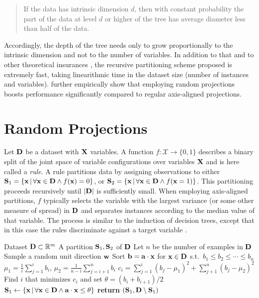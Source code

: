 \begin{quote}
  If the data has intrinsic dimension $d$, then with constant probability the part of the data at
  level $d$ or higher of the tree has average diameter less than half of the data.
\end{quote}

Accordingly, the depth of the tree needs only to grow proportionally to the intrinsic dimension and
not to the number of variables. In addition to that and to other theoretical insurances
\citep{dhesi10}, the recursive partitioning scheme proposed is extremely fast, taking linearithmic
time in the dataset size (number of instances and variables). \citet{dasgupta08a} further
empirically show that employing random projections boosts performance significantly compared to
regular axis-aligned projections.

\section{Random Projections}
\label{sec:rp}

Let $\mathbf{D}$ be a dataset with $\mathbf{X}$ variables. A function $f:\mathcal{X}\to\{0,1\}$ describes
a binary split of the joint space of variable configurations over variables $\mathbf{X}$ and is here
called a \emph{rule}. A rule partitions data by assigning observations to either
$\mathbf{S}_1=\{\mathbf{x}\,|\,\forall\mathbf{x}\in\mathbf{D}\wedge f(\mathbf{x})=0\}$, or
$\mathbf{S}_2=\{\mathbf{x}\,|\,\forall\mathbf{x}\in\mathbf{D}\wedge f(\mathbf{x}=1)\}$. This partitioning proceeds
recursively until $|\mathbf{D}|$ is sufficiently small. When employing axis-aligned partitions, $f$
typically selects the variable with the largest variance (or some other measure of spread) in
$\mathbf{D}$ and separates instances according to the median value of that variable. The process is
similar to the induction of decision trees, except that in this case the rules discriminate against
a target variable \citep{breiman01}.

\begin{algorithm}[t]
  \caption{}\label{alg:splitsid}
  \begin{algorithmic}[1]
    \Require Dataset $\mathbf{D}\subset\mathbb{R}^m$
    \Ensure A partition $\mathbf{S}_1,\mathbf{S}_2$ of $\mathbf{D}$
    \State Let $n$ be the number of examples in $\mathbf{D}$
    \State Sample a random unit direction $\mathbf{w}$
    \State Sort $\mathbf{b}=\mathbf{a}\cdot\mathbf{x}$ for $\mathbf{x}\in\mathbf{D}$ s.t.\ $b_1\leq b_2\leq\dotsb\leq b_n$
      \State $\mu_1 = \frac{1}{i}\sum_{j=1}^i b_i$, \; $\mu_2 = \frac{1}{n-i}\sum_{j=i+1}^n b_i$
      \State $c_i = \sum_{j=1}^i (b_j - \mu_1)^2 + \sum_{j+1}^n (b_j - \mu_2)^2$
    \EndFor
    \State Find $i$ that minimizes $c_i$ and set $\theta = (b_i + b_{i+1})/2$
    \State $\mathbf{S}_1 \gets \{\mathbf{x}\,|\,\forall\mathbf{x}\in\mathbf{D}\wedge\mathbf{a}\cdot\mathbf{x}\leq\theta\}$
    \State \textbf{return} $(\mathbf{S}_1,\mathbf{D} \setminus \mathbf{S}_1)$
  \end{algorithmic}
\end{algorithm}

